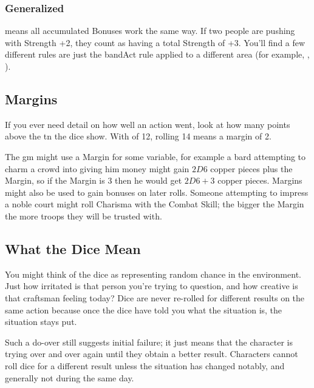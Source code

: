 \begin{multicols}{2}
\subsubsection{Generalized }
means all accumulated Bonuses work the same way.
If two people are pushing with Strength +2, they count as having a total Strength of +3.
You'll find a few different rules are just the \gls{bandAct} rule applied to a different area (for example, , ).

\subsection{Margins}
\label{margin}

If you ever need detail on how well an action went, look at how many points above the \gls{tn} the dice show.
With  of 12, rolling 14 means a margin of 2.

The \gls{gm} might use a Margin for some variable, for example a bard attempting to charm a crowd into giving him money might gain $2D6$ copper pieces plus the Margin, so if the Margin is 3 then he would get $2D6+3$ copper pieces.
Margins might also be used to gain bonuses on later rolls.
Someone attempting to impress a noble court might roll Charisma with the Combat Skill; the bigger the Margin the more troops they will be trusted with.

\subsection{What the Dice Mean}

You might think of the dice as representing random chance in the environment. Just how irritated is that person you're trying to question, and how creative is that craftsman feeling today? Dice are never re-rolled for different results on the same action because once the dice have told you what the situation is, the situation stays put.

Such a do-over still suggests initial failure; it just means that the character is trying over and over again until they obtain a better result.
Characters cannot roll dice for a different result unless the situation has changed notably, and generally not during the same day.

\end{multicols}

\section{}
\label{weight}

